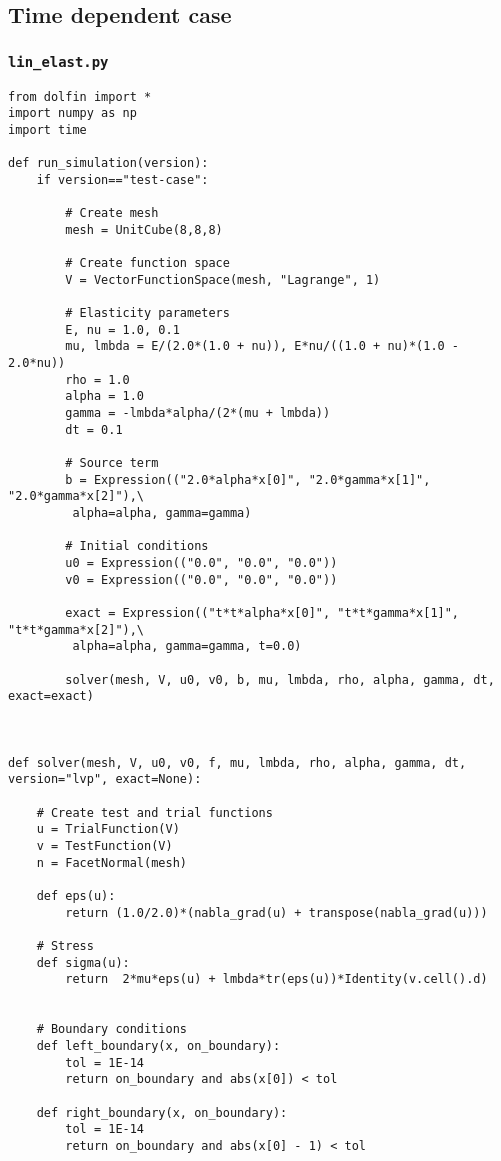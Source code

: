 \documentclass[twoside]{article}
\begin{document}
\subsection{Time dependent case}

\subsubsection{ \texttt{lin\_elast.py}}
\label{time:dependent:code}


\begin{verbatim}
from dolfin import *
import numpy as np
import time

def run_simulation(version):
	if version=="test-case":

		# Create mesh
		mesh = UnitCube(8,8,8)

		# Create function space
		V = VectorFunctionSpace(mesh, "Lagrange", 1)

		# Elasticity parameters
		E, nu = 1.0, 0.1
		mu, lmbda = E/(2.0*(1.0 + nu)), E*nu/((1.0 + nu)*(1.0 - 2.0*nu))
		rho = 1.0
		alpha = 1.0
		gamma = -lmbda*alpha/(2*(mu + lmbda))
		dt = 0.1

		# Source term
		b = Expression(("2.0*alpha*x[0]", "2.0*gamma*x[1]", "2.0*gamma*x[2]"),\
		 alpha=alpha, gamma=gamma)

		# Initial conditions
		u0 = Expression(("0.0", "0.0", "0.0"))
		v0 = Expression(("0.0", "0.0", "0.0"))

		exact = Expression(("t*t*alpha*x[0]", "t*t*gamma*x[1]", "t*t*gamma*x[2]"),\
		 alpha=alpha, gamma=gamma, t=0.0)

		solver(mesh, V, u0, v0, b, mu, lmbda, rho, alpha, gamma, dt, exact=exact)



def solver(mesh, V, u0, v0, f, mu, lmbda, rho, alpha, gamma, dt, version="lvp", exact=None):
	
	# Create test and trial functions
	u = TrialFunction(V)
	v = TestFunction(V)
	n = FacetNormal(mesh)

	def eps(u):
		return (1.0/2.0)*(nabla_grad(u) + transpose(nabla_grad(u)))

	# Stress
	def sigma(u):
	 	return  2*mu*eps(u) + lmbda*tr(eps(u))*Identity(v.cell().d)


	# Boundary conditions
	def left_boundary(x, on_boundary):
		tol = 1E-14
		return on_boundary and abs(x[0]) < tol

	def right_boundary(x, on_boundary):
		tol = 1E-14
		return on_boundary and abs(x[0] - 1) < tol


\end{verbatim}
\end{document}
